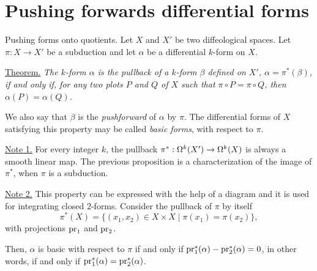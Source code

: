 \section{Pushing forwards differential forms}

\begin{Article}{Pushing forms onto quotients.}{}
  \label{Pushing-forms-onto-quotients}
  Let $X$ and $X'$ be two diffeological spaces.
  Let $\pi: X \to X'$ be a subduction and let $\alpha$ be a differential $k$-form on $X$.

  \uline{Theorem.} {\itshape The $k$-form $\alpha$ is the pullback of a $k$-form $\beta$ defined on $X'$,
  $\alpha = \pi^*(\beta)$,
  if and only if,
  for any two plots $P$ and $Q$ of $X$ such that $\pi \circ P = \pi \circ Q$,
  then $\alpha(P) = \alpha(Q)$.}

  We also say that $\beta$ is the \emph{pushforward} of $\alpha$ by $\pi$.
  The differential forms of $X$ satisfying this property may be called \emph{basic forms},
  with respect to $\pi$.

  \uline{Note 1.} For every integer $k$,
  the pullback $\pi^*: \Omega^k(X') \to \Omega^k(X)$ is always a smooth linear map.
  The previous proposition is a characterization of the image of $\pi^*$, when $\pi$ is a subduction.

  \uline{Note 2.} This property can be expressed with the help of a diagram and it is used for integrating closed $2$-forms.
  Consider the pullback of $\pi$ by itself
  $$%
    \pi^*(X) = \{ (x_1,x_2) \in X \times X \mid \pi(x_1) = \pi(x_2)\},
  $$%
  with projections $\operatorname{pr}_1$ and $\operatorname{pr}_2$.
  \begin{center}
  \end{center}
  Then,
  $\alpha$ is basic with respect to $\pi$ if and only if $\operatorname{pr}_1^*(\alpha) - \operatorname{pr}_2^*(\alpha) = 0$,
  in other words,
  if and only if $\operatorname{pr}_1^*(\alpha) = \operatorname{pr}_2^*(\alpha)$.
\end{Article}

